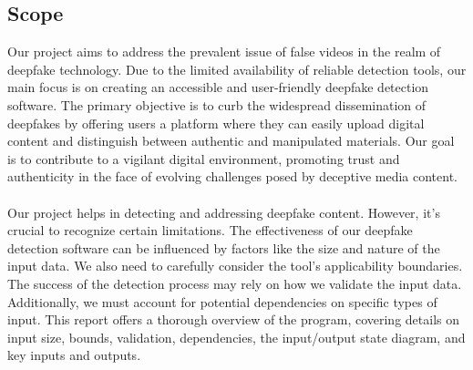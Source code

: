 \subsection{Scope}

Our project aims to address the prevalent issue of false videos in the realm of deepfake technology. Due to the limited availability of reliable detection tools, our main focus is on creating an accessible and user-friendly deepfake detection software. The primary objective is to curb the widespread dissemination of deepfakes by offering users a platform where they can easily upload digital content and distinguish between authentic and manipulated materials. Our goal is to contribute to a vigilant digital environment, promoting trust and authenticity in the face of evolving challenges posed by deceptive media content.
\\\\
Our project helps in detecting and addressing deepfake content. However, it's crucial to recognize certain limitations. The effectiveness of our deepfake detection software can be influenced by factors like the size and nature of the input data. We also need to carefully consider the tool's applicability boundaries. The success of the detection process may rely on how we validate the input data. Additionally, we must account for potential dependencies on specific types of input. This report offers a thorough overview of the program, covering details on input size, bounds, validation, dependencies, the input/output state diagram, and key inputs and outputs.
\newpage